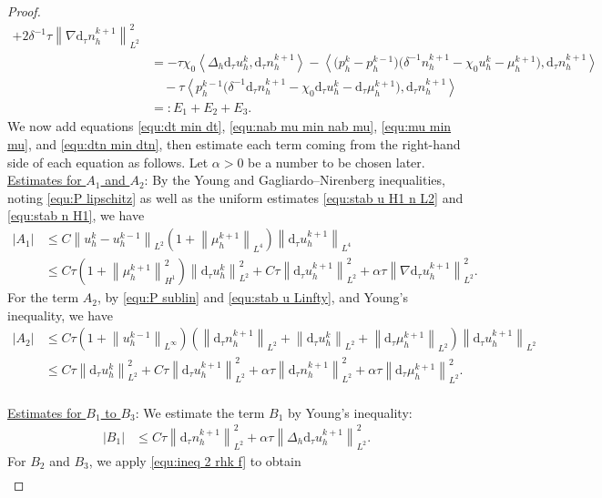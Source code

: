 \documentclass[11pt, reqno]{amsart}
\theoremstyle{definition}
\numberwithin{equation}{section}
\newcommand{\dtt}{\mathrm{d}_\tau}
\newcommand{\norm}[2]{\left\|{#1}\right\|_{#2}}
\newcommand{\inpro}[2]{\left\langle#1,#2\right\rangle}
\newcommand{\abs}[1]{\left|{#1}\right|}
\begin{document}
\begin{proof}
\begin{align}
	+
	2\delta^{-1} \tau \norm{\nabla\dtt n_h^{k+1}}{L^2}^2
	\nonumber\\
	&=
	-\tau\chi_0 \inpro{\Delta_h \dtt u_h^k}{\dtt n_h^{k+1}}
	- \inpro{\big(p_h^k-p_h^{k-1}\big)\big(\delta^{-1} n_h^{k+1}-\chi_0 u_h^k - \mu_h^{k+1}\big)}{\dtt n_h^{k+1}}
	\nonumber\\
	&\quad
	-
	\tau 
	\inpro{p_h^{k-1} \big(\delta^{-1} \dtt n_h^{k+1}- \chi_0 \dtt u_h^k - \dtt \mu_h^{k+1} \big)}{\dtt n_h^{k+1}}
	\nonumber\\
	&=:E_1+E_2+E_3.
\end{align}
We now add equations \eqref{equ:dt min dt}, \eqref{equ:nab mu min nab mu}, \eqref{equ:mu min mu}, and \eqref{equ:dtn min dtn}, then estimate each term coming from the right-hand side of each equation as follows. Let $\alpha>0$ be a number to be chosen later.
\\[2ex]
\underline{Estimates for $A_1$ and $A_2$}: By the Young and Gagliardo--Nirenberg inequalities, noting \eqref{equ:P lipschitz} as well as the uniform estimates \eqref{equ:stab u H1 n L2} and \eqref{equ:stab n H1}, we have
\begin{align*}
	\abs{A_1}
	&\leq
	C\norm{u_h^k-u_h^{k-1}}{L^2} \left(1+\norm{\mu_h^{k+1}}{L^4}\right) \norm{\dtt u_h^{k+1}}{L^4}
	\\
	&\leq
	C\tau \left(1+\norm{\mu_h^{k+1}}{H^1}^2 \right) \norm{\dtt u_h^k}{L^2}^2
	+
	C\tau \norm{\dtt u_h^{k+1}}{L^2}^2
	+
	\alpha \tau \norm{\nabla \dtt u_h^{k+1}}{L^2}^2.
\end{align*}
For the term $A_2$, by \eqref{equ:P sublin} and \eqref{equ:stab u Linfty}, and Young's inequality, we have
\begin{align*}
	\abs{A_2}
	&\leq
	C\tau \left(1+ \norm{u_h^{k-1}}{L^\infty}\right) \left(\norm{\dtt n_h^{k+1}}{L^2} + \norm{\dtt u_h^k}{L^2} + \norm{\dtt \mu_h^{k+1}}{L^2} \right) \norm{\dtt u_h^{k+1}}{L^2}
	\\
	&\leq
	C\tau \norm{\dtt u_h^k}{L^2}^2 + C\tau \norm{\dtt u_h^{k+1}}{L^2}^2 + \alpha\tau \norm{\dtt n_h^{k+1}}{L^2}^2 + \alpha\tau \norm{\dtt \mu_h^{k+1}}{L^2}^2.
\end{align*}
\\
\underline{Estimates for $B_1$ to $B_3$}: We estimate the term $B_1$ by Young's inequality:
\begin{align*}
	\abs{B_1}
	&\leq
	C \tau \norm{\dtt n_h^{k+1}}{L^2}^2
	+
	\alpha\tau \norm{\Delta_h \dtt u_h^{k+1}}{L^2}^2.
\end{align*}
For $B_2$ and $B_3$, we apply \eqref{equ:ineq 2 rhk f} to obtain
\begin{align*}

\end{align*}
\end{proof}
\end{document}
